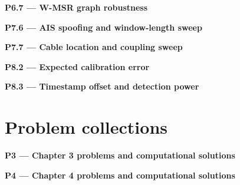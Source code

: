 \par\medskip{}\label{code:P6.7}
\noindent\textbf{P6.7 --- W-MSR graph robustness}\par
\noindent{}\par

\par\medskip{}\label{code:P7.6}
\noindent\textbf{P7.6 --- AIS spoofing and window-length sweep}\par
\noindent{}\par

\par\medskip{}\label{code:P7.7}
\noindent\textbf{P7.7 --- Cable location and coupling sweep}\par
\noindent{}\par

\par\medskip{}\label{code:P8.2}
\noindent\textbf{P8.2 --- Expected calibration error}\par
\noindent{}\par

\par\medskip{}\label{code:P8.3}
\noindent\textbf{P8.3 --- Timestamp offset and detection power}\par
\noindent{}\par

\section*{Problem collections}

\par\medskip{}\label{code:P3}
\noindent\textbf{P3 --- Chapter 3 problems and computational solutions}\par
\noindent{}\par

\par\medskip{}\label{code:P4}
\noindent\textbf{P4 --- Chapter 4 problems and computational solutions}\par
\noindent{}\par

